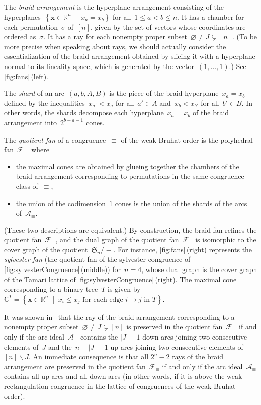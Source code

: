 \documentclass{amsart}
\theoremstyle{definition}
\newcommand{\R}{\mathbb{R}} %
\renewcommand{\c}[1]{\mathcal{#1}} %
\renewcommand{\b}[1]{{\boldsymbol{#1}}} %
\newcommand{\f}[1]{\mathfrak{#1}} %
\newcommand{\set}[2]{\left\{ #1 \;\middle|\; #2 \right\}} %
\newcommand{\ssm}{\smallsetminus} %
\newcommand{\eqdef}{\mbox{\,\raisebox{0.2ex}{\scriptsize\ensuremath{\mathrm:}}\ensuremath{=}\,}} %
\newcommand{\darkblue}{\color{darkblue}} %
\newcommand{\defn}[1]{\textsl{\darkblue #1}} %
\newcommand{\polytope}[1]{\mathds{#1}} %
\begin{document}
The \defn{braid arrangement} is the hyperplane arrangement consisting of the hyperplanes~$\set{\b{x} \in \R^n}{x_a = x_b}$ for all~$1 \le a < b \le n$.
It has a chamber for each permutation~$\sigma$ of~$[n]$, given by the set of vectors whose coordinates are ordered as~$\sigma$.
It has a ray for each nonempty proper subset~$\varnothing \ne J \subsetneq [n]$.
(To be more precise when speaking about rays, we should actually consider the essentialization of the braid arrangement obtained by slicing it with a hyperplane normal to its lineality space, which is generated by the vector~$(1, \dots, 1)$.)
See \cref{fig:fans}\,(left).

The \defn{shard} of an arc~$(a, b, A, B)$ is the piece of the braid hyperplane~${x_a = x_b}$ defined by the inequalities~$x_{a'} < x_a$ for all~$a' \in A$ and~$x_b < x_{b'}$ for all~$b' \in B$.
In other words, the shards decompose each hyperplane~$x_a = x_b$ of the braid arrangement into~$2^{b-a-1}$ cones.

The \defn{quotient fan} of a congruence~$\equiv$ of the weak Bruhat order is the polyhedral fan~$\c{F}_\equiv$~where
\begin{itemize}
\item the maximal cones are obtained by glueing together the chambers of the braid arrangement corresponding to permutations in the same congruence class of~$\equiv$,
\item the union of the codimension~$1$ cones is the union of the shards of the arcs of~$\c{A}_\equiv$.
\end{itemize}
(These two descriptions are equivalent.)
By construction, the braid fan refines the quotient fan~$\c{F}_\equiv$, and the dual graph of the quotient fan~$\c{F}_\equiv$ is isomorphic to the cover graph of the quotient~$\f{S}_n/{\equiv}$.
For instance, \cref{fig:fans}\,(right) represents the \defn{sylvester fan} (the quotient fan of the sylvester congruence of \cref{fig:sylvesterCongruence}\,(middle)) for~$n = 4$, whose dual graph is the cover graph of the Tamari lattice of \cref{fig:sylvesterCongruence}\,(right).
The maximal cone corresponding to a binary tree~$T$ is given by~$\polytope{C}^T = \set{\b{x} \in \R^n}{x_i \le x_j \text{ for each edge } i \to j \text{ in } T}$.

It was shown in~\cite[Lem.~23]{MR4328906} that the ray of the braid arrangement corresponding to a nonempty proper subset~$\varnothing \ne J \subsetneq [n]$ is preserved in the quotient fan~$\c{F}_\equiv$ if and only if the arc ideal~$\c{A}_\equiv$ contains the $|J|-1$ down arcs joining two consecutive elements of~$J$ and the~$n-|J|-1$ up arcs joining two consecutive elements of~$[n] \ssm J$.
An immediate consequence is that all $2^n-2$ rays of the braid arrangement are preserved in the quotient fan~$\c{F}_\equiv$ if and only if the arc ideal~$\c{A}_\equiv$ contains all up arcs and all down arcs (in other words, if it is above the weak rectangulation congruence in the lattice of congruences of the weak Bruhat order).
\end{document}
